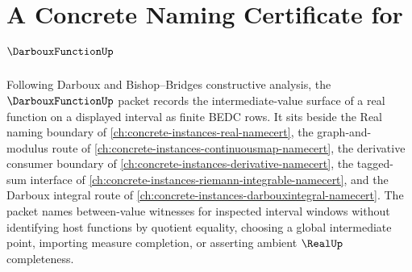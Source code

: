 \chapter{A Concrete Naming Certificate for $\DarbouxFunctionUp$}
\label{ch:concrete-instances-darboux-function-namecert}

Following Darboux and Bishop--Bridges constructive analysis, the $\DarbouxFunctionUp$ packet records the intermediate-value surface of a real function on a displayed interval as finite BEDC rows. It sits beside the Real naming boundary of \autoref{ch:concrete-instances-real-namecert}, the graph-and-modulus route of \autoref{ch:concrete-instances-continuousmap-namecert}, the derivative consumer boundary of \autoref{ch:concrete-instances-derivative-namecert}, the tagged-sum interface of \autoref{ch:concrete-instances-riemann-integrable-namecert}, and the Darboux integral route of \autoref{ch:concrete-instances-darbouxintegral-namecert}. The packet names between-value witnesses for inspected interval windows without identifying host functions by quotient equality, choosing a global intermediate point, importing measure completion, or asserting ambient $\RealUp$ completeness.

